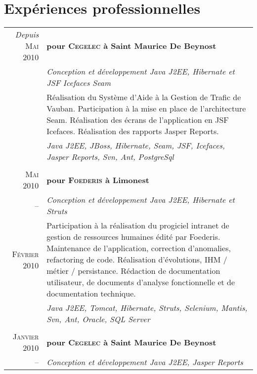 \documentclass[a4paper,10pt]{article}
\begin{document}
\section{Expériences professionnelles}
\begin{supertabular}{r|p{11cm}}
  \emph{Depuis} \textsc{Mai 2010}  & \textbf{pour \textsc{Cegelec} à Saint Maurice De Beynost}                           \\ 
  & \emph{Conception et développement Java J2EE, Hibernate et JSF Icefaces Seam}                                         \\
  & \footnotesize{Réalisation du Système d'Aide à la Gestion de Trafic de Vauban. Participation à la mise en place de l'architecture Seam. Réalisation des écrans de l'application en JSF Icefaces. Réalisation des rapports Jasper Reports.} \\
  & \emph{Java J2EE, JBoss, Hibernate, Seam, JSF, Icefaces, Jasper Reports, Svn, Ant, PostgreSql}                        \\
                                                                                                     \\
  \textsc{Mai 2010} & \textbf{pour \textsc{Foederis} à Limonest}                                                         \\ 
  -- & \emph{Conception et développement Java J2EE, Hibernate et Struts}                                                \\
  \footnotesize{\textsc{Février 2010}} & \footnotesize{Participation à la réalisation du progiciel intranet de gestion de ressources humaines édité par Foederis. Maintenance de l'application, correction d'anomalies, refactoring de code. Réalisation d'évolutions, IHM / métier / persistance. Rédaction de documentation utilisateur, de documents d'analyse fonctionnelle et de documentation technique.} \\
  & \emph{Java J2EE, Tomcat, Hibernate, Struts,  Selenium, Mantis, Svn, Ant, Oracle, SQL Server}                         \\
                                                                                                     \\
  \textsc{Janvier 2010} & \textbf{pour \textsc{Cegelec} à Saint Maurice De Beynost}                                      \\ 
  -- & \emph{Conception et développement Java J2EE, Jasper Reports}                                                     \\

\end{supertabular}
\end{document}
